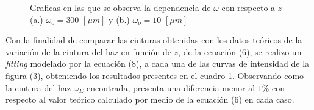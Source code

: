 \documentclass[11pt,letterpaper,twocolumn]{article}
\begin{document}
\begin{figure}[h!]
\begin{center}
\caption{Graficas en las que se observa la dependencia de $\omega$ con respecto a $z$ (a.) $\omega_{o}=300$ $[\mu m]$ y (b.) $\omega_{o}=10$ $[\mu m]$}
\end{center}
\label{pos}
\end{figure}
\par 
Con la finalidad de comparar las cinturas obtenidas con los datos teóricos de la variación de la cintura del haz en función de $z$, de la ecuación (6), se realizo un \textit{fitting} modelado por la ecuación (8), a cada una de las curvas de intensidad de la figura (3), obteniendo los resultados presentes en el cuadro 1. Observando como la cintura del haz $\omega_{E}$ encontrada, presenta una diferencia menor al $1\%$ con respecto al valor teórico calculado por medio de la ecuación (6) en cada caso.\\  
\end{document}
